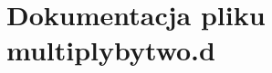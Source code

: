 \hypertarget{multiplybytwo_8d}{\section{Dokumentacja pliku multiplybytwo.\-d}
\label{multiplybytwo_8d}
}

